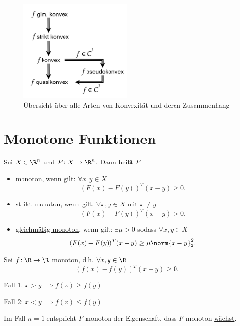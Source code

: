 \begin{figure}[H]
	\begin{center}
		\includegraphics[width=0.5\textwidth]{pics/texplot4.png}
	\end{center}
	\caption{Übersicht über alle Arten von Konvexität und deren Zusammenhang}
	\label{fig:übersichtkonvex}
\end{figure}

\section{Monotone Funktionen}%
\label{sec:Monotone Funktionen}

\begin{definition}
\label{thm:monotonefunktionen}
	Sei $X \in \R^{n}$ und $F \colon X \rightarrow \R^{n}$. Dann heißt $F$
	\begin{itemize}
		\item \underline{monoton}, wenn gilt: $\forall x,y \in X$
			\[
				\left( F(x) - F(y) \right)^{T}(x-y) \geq 0	
			.\] 
		\item \underline{strikt monoton}, wenn gilt: $\forall x,y \in X$ mit $x \neq y$
			\[
				( F(x) - F(y) )^{T}(x-y) > 0	
			.\] 
		\item \underline{gleichmäßig monoton}, wenn gilt: $\exists \mu > 0$ sodass $\forall x, y \in X$
			\[
				( F(x) - F(y) )^{T}(x-y) \geq \mu \norm{x-y} _{2}^{2}
			.\] 
	\end{itemize}
\end{definition}

\begin{beispiel}
\label{thm:beispielmonotonefunktionen1}
	Sei $f \colon \R \rightarrow \R $ monoton, d.h. $\forall x,y \in \R $
	\[
		(f(x)-f(y))^{T}(x-y) \geq 0
	.\]
	\begin{center}
			Fall 1: $x > y \implies f(x) \geq f(y)$

			Fall 2: $x < y \implies f(x) \leq f(y)$
	\end{center}

	Im Fall $n=1$ entspricht $F$ monoton der Eigenschaft, dass $F$ monoton \underline{wächst}.
\end{beispiel}

